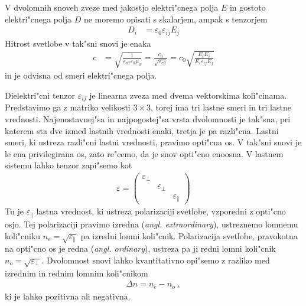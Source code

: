 \documentclass[a4paper,10pt]{article}
\newcommand{\angl}[1]{(\textit{angl. #1})}
\begin{document}
V dvolomnih snoveh zveze med jakostjo elektri"cnega polja $E$ in gostoto elektri"cnega polja $D$ ne moremo opisati s skalarjem, ampak s tenzorjem
\begin{align}
  D_i &= \varepsilon_0 \varepsilon_{ij} E_j
\end{align}
Hitrost svetlobe v tak"sni snovi je enaka
\begin{align}
  c &= \sqrt{\frac{1}{\varepsilon_{\mathrm{eff}} \varepsilon_0 \mu_0}} = \frac{c_0}{\sqrt{\varepsilon_{\mathrm{eff}}}} = c_0\sqrt{\frac{E_iE_i}{E_i \varepsilon_{ij} E_j}}
\end{align}
in je odvisna od smeri elektri"cnega polja. 

Dielektri"cni tenzor $\varepsilon_{ij}$ je linearna zveza med dvema vektorskima koli"cinama. 
Predstavimo ga z matriko velikosti $3\times 3$, torej ima tri lastne smeri in tri lastne vrednosti.
Najenostavnej"sa in najpogostej"sa vrsta dvolomnosti je tak"sna, pri katerem sta dve izmed lastnih vrednosti enaki, tretja je pa razli"cna. 
Lastni smeri, ki ustreza razli"cni lastni vrednosti, pravimo opti"cna os. 
V tak"sni snovi je le ena privilegirana os, zato re"cemo, da je snov opti"cno enoosna. 
V lastnem sistemu lahko tenzor zapi"semo kot
\begin{align}
  \varepsilon = \begin{pmatrix}\varepsilon_\perp & & \\ & \varepsilon_\perp & \\ & & \varepsilon_\parallel \end{pmatrix}
\end{align}
Tu je $\varepsilon_\parallel$ lastna vrednost, ki ustreza polarizaciji svetlobe, vzporedni z opti"cno osjo. 
Tej polarizaciji pravimo izredna \angl{extraordinary}, ustreznemo lomnemu koli"cniku $n_e = \sqrt{\varepsilon_\parallel}$ pa izredni lomni koli"cnik. 
Polarizacija svetlobe, pravokotna na opti"cno os je redna \angl{ordinary}, ustreza pa ji redni lomni koli"cnik $n_o = \sqrt{\varepsilon_\perp}$. 
Dvolomnost snovi lahko kvantitativno opi"semo z razliko med izrednim in rednim lomnim koli"cnikom
\begin{align}
  \Delta n = n_e - n_o\;,
\end{align}
ki je lahko pozitivna ali negativna. 
\end{document}
